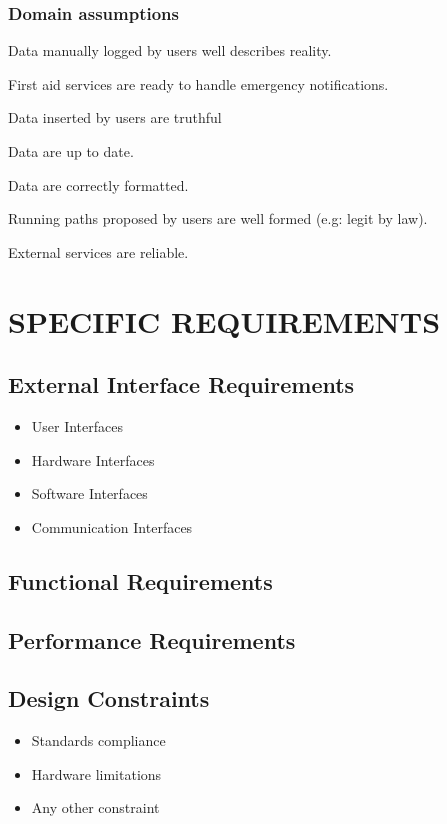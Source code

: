 \documentclass{article}
\begin{document}
\subsubsection{Domain assumptions}

\begin{enumerate}[label={[D\arabic*]}]
    	\item Data manually logged by users well describes reality.
    	\item First aid services are ready to handle emergency notifications.
    	\item Data inserted by users are truthful 
    		\begin{enumerate}[label={[D\arabic{enumi}.\arabic*]}]
    			\item Data are up to date.
    			\item Data are correctly formatted.
  			\end{enumerate}
  		
  		\item Running paths proposed by users are well formed (e.g: legit by law).
  		\item External services are reliable.
\end{enumerate}

\section{SPECIFIC REQUIREMENTS}
\subsection{External Interface Requirements}
		\begin{itemize}
			\item User Interfaces
			\item Hardware Interfaces
			\item Software Interfaces
			\item Communication Interfaces
		\end{itemize}
\subsection{Functional Requirements}	

\subsection{Performance Requirements}
\subsection{Design Constraints}
		\begin{itemize}
			\item Standards compliance
			\item Hardware limitations
			\item Any other constraint
		\end{itemize}
\end{document}
